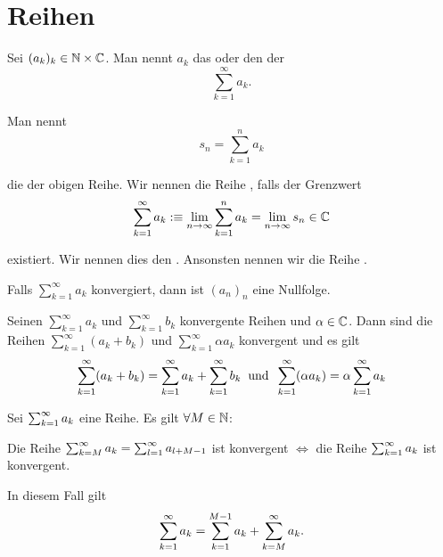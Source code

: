 \section{Reihen}

\begin{mydef}
	Sei $(a_k)_k \in \mathbb{N} \times \mathbb{C}$. Man nennt $a_k$ das  oder den  der 
  \begin{equation}
		\sum_{k=1}^{\infty} a_k.
	\end{equation}

  Man nennt
	\begin{equation}
		s_n=\sum_{k=1}^{n} a_k
	\end{equation}

	die  der obigen Reihe. Wir nennen die Reihe , falls der Grenzwert
	\begin{equation}
		\sum_{k=1}^\infty a_k :\equiv \lim_{n \to \infty} \sum_{k=1}^{n} a_k = \lim_{n \to \infty} s_n \in \mathbb{C}
	\end{equation}

	existiert. Wir nennen dies den . Ansonsten nennen wir die Reihe .
\end{mydef}

\begin{thm}
	Falls $\sum_{k=1}^{\infty} a_k$ konvergiert, dann ist $(a_n)_n$ eine Nullfolge.
\end{thm}

\setcounter{thm}{5}
\begin{thm}[Linearität]
	Seinen $\sum_{k=1}^{\infty} a_k$ und $\sum_{k=1}^{\infty} b_k$ konvergente Reihen und $\alpha \in \mathbb{C}$. Dann sind die Reihen  $\sum_{k=1}^{\infty} (a_k + b_k)$ und $\sum_{k=1}^{\infty} \alpha a_k$ konvergent und es gilt
	\begin{equation}
		\sum_{k=1}^{\infty} (a_k + b_k) = \sum_{k=1}^{\infty} a_k + \sum_{k=1}^{\infty} b_k \;\; \text{und}\;\; \sum_{k=1}^{\infty} (\alpha a_k) = \alpha \sum_{k=1}^{\infty} a_k
	\end{equation}
\end{thm}

\setcounter{thm}{7}
\begin{thm}
	Sei $\sum_{k=1}^{\infty} a_k$ eine Reihe. Es gilt $\forall M \in \mathbb{N}$:

	Die Reihe $\sum_{k=M}^{\infty} a_k = \sum_{l=1}^{\infty} a_{l+M-1}$ ist konvergent $\iff$ die Reihe $\sum_{k=1}^{\infty} a_k$ ist konvergent.

	In diesem Fall gilt
	\begin{equation}
		\sum_{k=1}^{\infty} a_k = \sum_{k=1}^{M-1} a_k + \sum_{k=M}^{\infty} a_k.
	\end{equation}
\end{thm}

